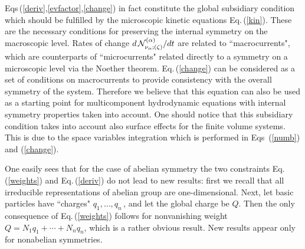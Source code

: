 \documentclass[a4paper,11pt]{article}
\begin{document}
Eqs\,(\ref{deriv},\ref{evfactor},\ref{change}) in fact constitute
the global subsidiary condition which should be fulfilled by the
 microscopic kinetic equations Eq.\,(\ref{kin}). These are the
necessary conditions for preserving the internal symmetry on the
macroscopic level. Rates of change
 ${d\,{\cal N}^{(\alpha)}_{\nu_\alpha;(\zeta)}}/{dt}$
are related to ``macrocurrents", which are counterparts of
``microcurrents" related directly to a symmetry on a microscopic
level via the Noether theorem. Eq.\,(\ref{change}) can be
considered as a set of conditions on macrocurrents to provide
consistency with the overall symmetry of the system. Therefore we
believe that this equation can also be used as a starting point
for multicomponent hydrodynamic equations with internal symmetry
properties taken into account. One should notice that this
subsidiary condition takes into account also surface effects for
the finite volume systems. This is due to the space variables
integration which is performed in Eqs\, (\ref{numb}) and
(\ref{change}).

One easily sees that for the case of abelian symmetry the two
constraints Eq.\,(\ref{weights}) and Eq.\,(\ref{deriv}) do not
lead to new results: first we recall that all irreducible
representations of abelian group are one-dimensional. Next, let
basic particles have ``charges" $q_1,\dots, q_n$\,, and let the
global charge be $Q$. Then the only consequence of
Eq.\,(\ref{weights}) follows for nonvanishing weight $Q=N_1
q_1+\cdots+N_n q_n$, which is a rather obvious result. New results
appear only for nonabelian symmetries.

\end{document}
